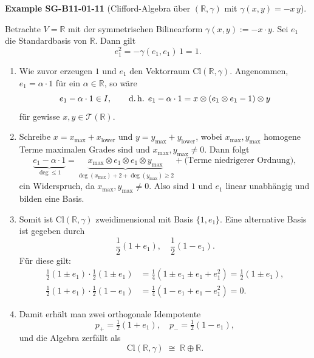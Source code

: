 \documentclass[10pt, letterpaper]{article}
\newcommand{\Cl}{\mathrm{Cl}}
\newcommand{\CustomHeading}[3]{%
  \par\medskip\noindent%
  \textbf{#1 #2} \textnormal{(#3)}.\enskip%
}
\newenvironment{EXA}[2]{\begin{unitbox}\CustomHeading{Example}{#1}{#2}}{\end{unitbox}}
\begin{document}
\begin{EXA}{SG-B11-01-11}{Clifford-Algebra über $(\mathbb{R},\gamma)$ mit $\gamma(x,y)=-x\,y$}
Betrachte $V=\mathbb{R}$ mit der symmetrischen Bilinearform $\gamma(x,y):=-x\cdot y$.
Sei $e_{1}$ die Standardbasis von $\mathbb{R}$.
Dann gilt
\[
e_{1}^{2}=-\gamma(e_{1},e_{1})\,1=1.
\]

\begin{enumerate}
\item Wie zuvor erzeugen $1$ und $e_{1}$ den Vektorraum $\Cl(\mathbb{R},\gamma)$.
Angenommen, $e_{1}=\alpha\cdot 1$ für ein $\alpha\in\mathbb{R}$, so wäre
\[
e_{1}-\alpha\cdot 1\in I,\qquad
\text{d.\,h. } e_{1}-\alpha\cdot 1 = x\otimes (e_{1}\otimes e_{1}-1)\otimes y
\]
für gewisse $x,y\in\mathcal{T}(\mathbb{R})$.

\item Schreibe $x=x_{\max}+x_{\mathrm{lower}}$ und $y=y_{\max}+y_{\mathrm{lower}}$, wobei
$x_{\max},y_{\max}$ homogene Terme maximalen Grades sind und $x_{\max},y_{\max}\neq 0$.
Dann folgt
\[
\underbrace{e_{1}-\alpha\cdot 1}_{\deg\le1}
=\underbrace{x_{\max}\otimes e_{1}\otimes e_{1}\otimes y_{\max}}_{\deg(x_{\max})+2+\deg(y_{\max})\ge2}
+\text{(Terme niedrigerer Ordnung)},
\]
ein Widerspruch, da $x_{\max},y_{\max}\neq0$.
Also sind $1$ und $e_{1}$ linear unabhängig und bilden eine Basis.

\item Somit ist $\Cl(\mathbb{R},\gamma)$ zweidimensional mit Basis $\{1,e_{1}\}$.
Eine alternative Basis ist gegeben durch
\[
\frac{1}{2}(1+e_{1}),\quad \frac{1}{2}(1-e_{1}).
\]
Für diese gilt:
\[
\begin{aligned}
\frac{1}{2}(1\pm e_{1})\cdot \frac{1}{2}(1\pm e_{1})
&=\frac{1}{4}(1\pm e_{1}\pm e_{1}+e_{1}^{2})
=\frac{1}{2}(1\pm e_{1}),\\[4pt]
\frac{1}{2}(1+e_{1})\cdot \frac{1}{2}(1-e_{1})
&=\frac{1}{4}(1-e_{1}+e_{1}-e_{1}^{2})=0.
\end{aligned}
\]

\item Damit erhält man zwei orthogonale Idempotente
\[
p_{+}=\tfrac{1}{2}(1+e_{1}),\quad p_{-}=\tfrac{1}{2}(1-e_{1}),
\]
und die Algebra zerfällt als
\[
\Cl(\mathbb{R},\gamma)\;\cong\;\mathbb{R}\oplus\mathbb{R}.
\]
\end{enumerate}
\end{EXA}
\end{document}
